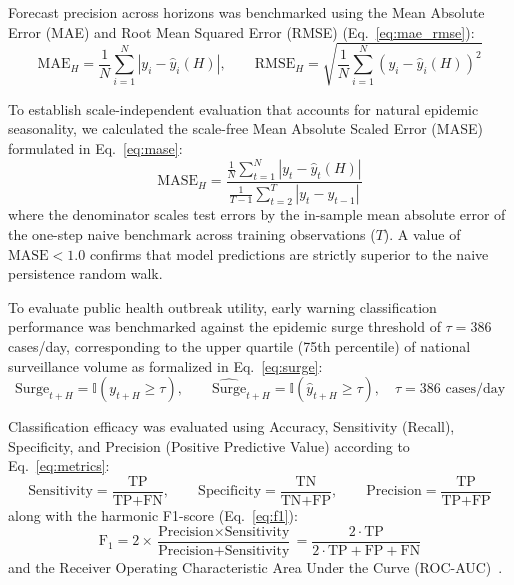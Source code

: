 \documentclass[11pt,a4paper]{article}
\begin{document}
Forecast precision across horizons was benchmarked using the Mean Absolute Error (MAE) and Root Mean Squared Error (RMSE) (Eq.~\eqref{eq:mae_rmse}):
\begin{equation}
\text{MAE}_H = \frac{1}{N}\sum_{i=1}^N \left|y_i - \hat{y}_i(H)\right|, \qquad \text{RMSE}_H = \sqrt{\frac{1}{N}\sum_{i=1}^N \left(y_i - \hat{y}_i(H)\right)^2}
\label{eq:mae_rmse}
\end{equation}

To establish scale-independent evaluation that accounts for natural epidemic seasonality, we calculated the scale-free Mean Absolute Scaled Error (MASE)~\cite{hyndman2006another} formulated in Eq.~\eqref{eq:mase}:
\begin{equation}
\text{MASE}_H = \frac{\frac{1}{N}\sum_{t=1}^N \left|y_t - \hat{y}_t(H)\right|}{\frac{1}{T-1}\sum_{t=2}^T \left|y_t - y_{t-1}\right|}
\label{eq:mase}
\end{equation}
where the denominator scales test errors by the in-sample mean absolute error of the one-step naive benchmark across training observations ($T$). A value of $\text{MASE} < 1.0$ confirms that model predictions are strictly superior to the naive persistence random walk.

To evaluate public health outbreak utility, early warning classification performance was benchmarked against the epidemic surge threshold of $\tau = 386$ cases/day, corresponding to the upper quartile (75th percentile) of national surveillance volume as formalized in Eq.~\eqref{eq:surge}:
\begin{equation}
\text{Surge}_{t+H} = \mathbb{I}\left(y_{t+H} \ge \tau\right), \qquad \hat{\text{Surge}}_{t+H} = \mathbb{I}\left(\hat{y}_{t+H} \ge \tau\right), \quad \tau = 386\text{ cases/day}
\label{eq:surge}
\end{equation}

Classification efficacy was evaluated using Accuracy, Sensitivity (Recall), Specificity, and Precision (Positive Predictive Value) according to Eq.~\eqref{eq:metrics}:
\begin{equation}
\text{Sensitivity} = \frac{\text{TP}}{\text{TP} + \text{FN}}, \qquad \text{Specificity} = \frac{\text{TN}}{\text{TN} + \text{FP}}, \qquad \text{Precision} = \frac{\text{TP}}{\text{TP} + \text{FP}}
\label{eq:metrics}
\end{equation}
along with the harmonic F1-score (Eq.~\eqref{eq:f1}):
\begin{equation}
\text{F}_1 = 2 \times \frac{\text{Precision} \times \text{Sensitivity}}{\text{Precision} + \text{Sensitivity}} = \frac{2 \cdot \text{TP}}{2 \cdot \text{TP} + \text{FP} + \text{FN}}
\label{eq:f1}
\end{equation}
and the Receiver Operating Characteristic Area Under the Curve (ROC-AUC)~\cite{youden1950index}.
\end{document}
